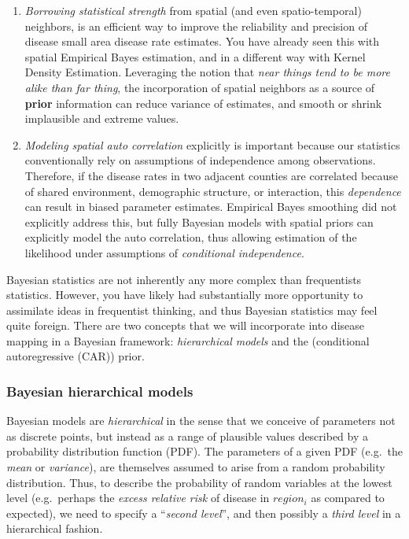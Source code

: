 \documentclass[
]{book}
\providecommand{\tightlist}{%
  \setlength{\itemsep}{0pt}\setlength{\parskip}{0pt}}
\begin{document}
\begin{enumerate}
\def\labelenumi{\arabic{enumi}.}
\tightlist
\item
  \emph{Borrowing statistical strength} from spatial (and even spatio-temporal) neighbors, is an efficient way to improve the reliability and precision of disease small area disease rate estimates. You have already seen this with spatial Empirical Bayes estimation, and in a different way with Kernel Density Estimation. Leveraging the notion that \emph{near things tend to be more alike than far thing}, the incorporation of spatial neighbors as a source of \textbf{prior} information can reduce variance of estimates, and smooth or shrink implausible and extreme values.
\item
  \emph{Modeling spatial auto correlation} explicitly is important because our statistics conventionally rely on assumptions of independence among observations. Therefore, if the disease rates in two adjacent counties are correlated because of shared environment, demographic structure, or interaction, this \emph{dependence} can result in biased parameter estimates. Empirical Bayes smoothing did not explicitly address this, but fully Bayesian models with spatial priors can explicitly model the auto correlation, thus allowing estimation of the likelihood under assumptions of \emph{conditional independence}.
\end{enumerate}

Bayesian statistics are not inherently any more complex than frequentists statistics. However, you have likely had substantially more opportunity to assimilate ideas in frequentist thinking, and thus Bayesian statistics may feel quite foreign. There are two concepts that we will incorporate into disease mapping in a Bayesian framework: \emph{hierarchical models} and the (conditional autoregressive (CAR)) prior.

\hypertarget{bayesian-hierarchical-models}{%
\subsubsection{Bayesian hierarchical models}\label{bayesian-hierarchical-models}}

Bayesian models are \emph{hierarchical} in the sense that we conceive of parameters not as discrete points, but instead as a range of plausible values described by a probability distribution function (PDF). The parameters of a given PDF (e.g.~the \emph{mean} or \emph{variance}), are themselves assumed to arise from a random probability distribution. Thus, to describe the probability of random variables at the lowest level (e.g.~perhaps the \emph{excess relative risk} of disease in \(region_i\) as compared to expected), we need to specify a ``\emph{second level}'', and then possibly a \emph{third level} in a hierarchical fashion.
\end{document}
